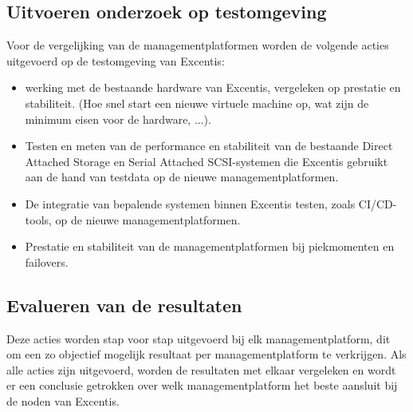 \subsection{Uitvoeren onderzoek op testomgeving}
Voor de vergelijking van de managementplatformen worden de volgende acties uitgevoerd op de testomgeving van Excentis:
\begin{itemize}
\item werking met de bestaande hardware van Excentis, vergeleken op prestatie en stabiliteit. (Hoe snel start een nieuwe virtuele machine op, wat zijn de minimum eisen voor de hardware, ...).
\item Testen en meten van de performance en stabiliteit van de bestaande Direct Attached Storage en Serial Attached SCSI-systemen die Excentis gebruikt aan de hand van testdata op de nieuwe managementplatformen.
\item De integratie van bepalende systemen binnen Excentis testen, zoals CI/CD-tools, op de nieuwe managementplatformen.
\item Prestatie en stabiliteit van de managementplatformen bij piekmomenten en failovers.
\end{itemize}
\subsection{Evalueren van de resultaten}
Deze acties worden stap voor stap uitgevoerd bij elk managementplatform, dit om een zo objectief mogelijk resultaat per managementplatform te verkrijgen.
Als alle acties zijn uitgevoerd, worden de resultaten met elkaar vergeleken en wordt er een conclusie getrokken over welk managementplatform het beste aansluit bij de noden van Excentis.




